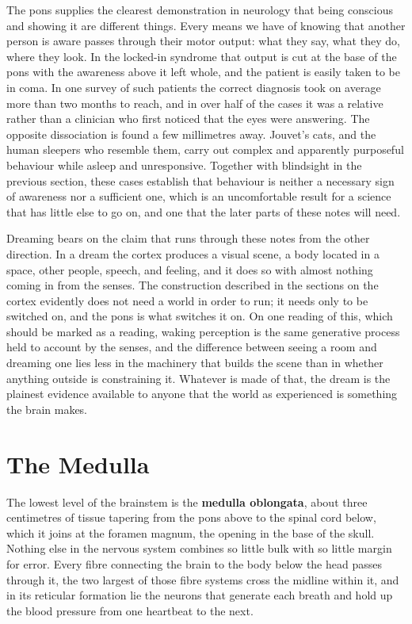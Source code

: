 \documentclass[11pt]{article}
\begin{document}
The pons supplies the clearest demonstration in neurology that being conscious and showing it are different things. Every means we have of knowing that another person is aware passes through their motor output: what they say, what they do, where they look. In the locked-in syndrome that output is cut at the base of the pons with the awareness above it left whole, and the patient is easily taken to be in coma. In one survey of such patients the correct diagnosis took on average more than two months to reach, and in over half of the cases it was a relative rather than a clinician who first noticed that the eyes were answering. The opposite dissociation is found a few millimetres away. Jouvet's cats, and the human sleepers who resemble them, carry out complex and apparently purposeful behaviour while asleep and unresponsive. Together with blindsight in the previous section, these cases establish that behaviour is neither a necessary sign of awareness nor a sufficient one, which is an uncomfortable result for a science that has little else to go on, and one that the later parts of these notes will need.

Dreaming bears on the claim that runs through these notes from the other direction. In a dream the cortex produces a visual scene, a body located in a space, other people, speech, and feeling, and it does so with almost nothing coming in from the senses. The construction described in the sections on the cortex evidently does not need a world in order to run; it needs only to be switched on, and the pons is what switches it on. On one reading of this, which should be marked as a reading, waking perception is the same generative process held to account by the senses, and the difference between seeing a room and dreaming one lies less in the machinery that builds the scene than in whether anything outside is constraining it. Whatever is made of that, the dream is the plainest evidence available to anyone that the world as experienced is something the brain makes.


\section{The Medulla}

The lowest level of the brainstem is the \textbf{medulla oblongata}, about three centimetres of tissue tapering from the pons above to the spinal cord below, which it joins at the foramen magnum, the opening in the base of the skull. Nothing else in the nervous system combines so little bulk with so little margin for error. Every fibre connecting the brain to the body below the head passes through it, the two largest of those fibre systems cross the midline within it, and in its reticular formation lie the neurons that generate each breath and hold up the blood pressure from one heartbeat to the next.
\end{document}
